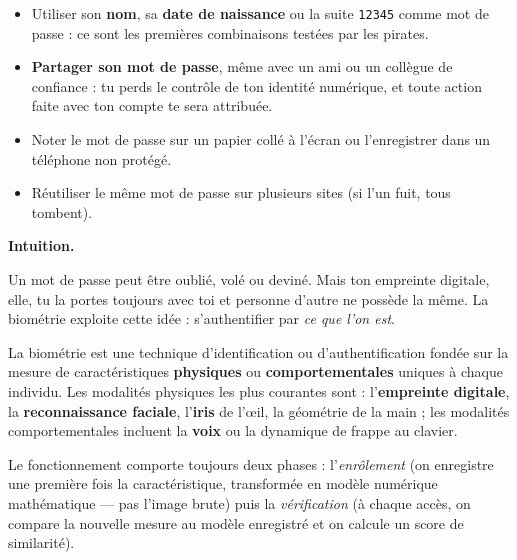 \documentclass[11pt]{article}
\newcommand{\cle}[1]{{\popxbold\color{popdark}#1}}
\newcounter{popsec}
\newcounter{popsub}
\newcommand{\courssub}[1]{%
  \stepcounter{popsub}%
  \par\vspace{9pt}\noindent{\popxbold\fontsize{11.5}{13}\selectfont\color{popink}{\color{poporange}\thepopsec.\thepopsub}\hspace{6pt}#1}\par\nopagebreak\vspace{4pt}
}
\begin{document}
\begin{attention}
\begin{itemize}
  \item Utiliser son \textbf{nom}, sa \textbf{date de naissance} ou la suite \texttt{12345} comme mot de passe : ce sont les premières combinaisons testées par les pirates.
  \item \textbf{Partager son mot de passe}, même avec un ami ou un collègue de confiance : tu perds le contrôle de ton identité numérique, et toute action faite avec ton compte te sera attribuée.
  \item Noter le mot de passe sur un papier collé à l'écran ou l'enregistrer dans un téléphone non protégé.
  \item Réutiliser le même mot de passe sur plusieurs sites (si l'un fuit, tous tombent).
\end{itemize}
\end{attention}

\courssub{La biométrie}

\textbf{Intuition.}\par
Un mot de passe peut être oublié, volé ou deviné. Mais ton empreinte digitale, elle, tu la portes toujours avec toi et personne d'autre ne possède la même. La biométrie exploite cette idée : s'authentifier par \emph{ce que l'on est}.

\begin{definition}[Biométrie]
La \cle{biométrie} est une technique d'identification ou d'authentification fondée sur la mesure de caractéristiques \textbf{physiques} ou \textbf{comportementales} uniques à chaque individu. Les modalités physiques les plus courantes sont : l'\textbf{empreinte digitale}, la \textbf{reconnaissance faciale}, l'\textbf{iris} de l'œil, la géométrie de la main ; les modalités comportementales incluent la \textbf{voix} ou la dynamique de frappe au clavier.
\end{definition}

Le fonctionnement comporte toujours deux phases : l'\emph{enrôlement} (on enregistre une première fois la caractéristique, transformée en modèle numérique mathématique — pas l'image brute) puis la \emph{vérification} (à chaque accès, on compare la nouvelle mesure au modèle enregistré et on calcule un score de similarité).
\end{document}
